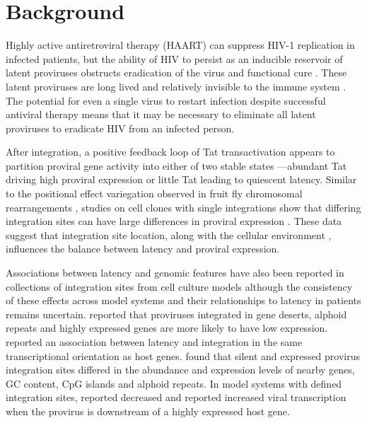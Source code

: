 \documentclass[../sherrill-Mix_thesis.tex]{subfiles}
\begin{document}
\section{Background}
	Highly active antiretroviral therapy (HAART) can suppress HIV-1 replication in infected patients, but the ability of HIV to persist as an inducible reservoir of latent proviruses \citep{Chun1995, Chun1997, Davey1999} obstructs eradication of the virus and functional cure \citep{Richman2009}. These latent proviruses are long lived \citep{Finzi1999,Siliciano2003} and relatively invisible to the immune system \citep{Finzi1997,Chun1997}. The potential for even a single virus to restart infection despite successful antiviral therapy means that it may be necessary to eliminate all latent proviruses to eradicate HIV from an infected person. %


	After integration, a positive feedback loop of Tat transactivation appears to partition proviral gene activity into either of two stable states \citep{Weinberger2008,Singh2010,Razooky2011}---abundant Tat driving high proviral expression or little Tat leading to quiescent latency. Similar to the positional effect variegation observed in fruit fly chromosomal rearrangements \citep{Muller1930,Gaszner2006}, studies on cell clones with single integrations show that differing integration sites can have large differences in proviral expression \citep{Jordan2001,Jordan2003,Pearson2008}. These data suggest that integration site location, along with the cellular environment \citep{Romerio1997,Coull2000,He2002,Pearson2008}, influences the balance between latency and proviral expression.  %


	 Associations between latency and genomic features have also been reported in collections of integration sites from cell culture models although the consistency of these effects across model systems and their relationships to latency in patients remains uncertain. \citet{Lewinski2005} reported that proviruses integrated in gene deserts, alphoid repeats and highly expressed genes are more likely to have low expression. \citet{Shan2011} reported an association between latency and integration in the same transcriptional orientation as host genes. \citet{Pace2012} found that silent and expressed provirus integration sites differed in the abundance and expression levels of nearby genes, GC content, CpG islands and alphoid repeats.  In model systems with defined integration sites, \citet{Lenasi2008} reported decreased and \citet{Han2008} reported increased viral transcription when the provirus is downstream of a highly expressed host gene. 
\end{document}

